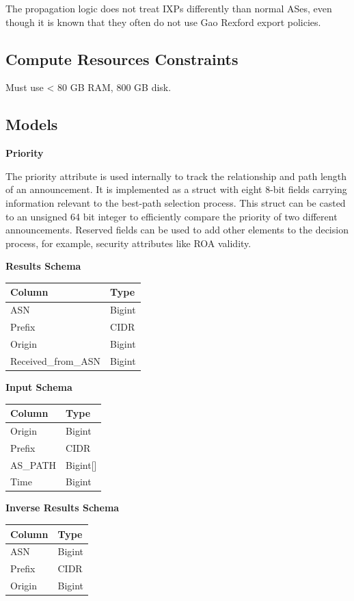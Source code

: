 \documentclass[letterpaper]{article}
\begin{document}
The propagation logic does not treat IXPs differently than normal
ASes, even though it is known that they often do not use Gao Rexford
export policies.

\hypertarget{constraints}{%
\subsection{Compute Resources Constraints}\label{constraints}}

Must use \textless{} 80 GB RAM, 800 GB disk.

\hypertarget{models}{%
\subsection{Models}\label{models}}


\textbf{Priority}

The priority attribute is used internally to track the relationship and path
length of an announcement. It is implemented as a struct with eight 8-bit fields
carrying information relevant to the best-path selection process. This struct
can be casted to an unsigned 64 bit integer to efficiently compare the priority
of two different announcements. Reserved fields can be used to add other
elements to the decision process, for example, security attributes like ROA
validity.

\textbf{Results Schema}

\begin{longtable}[]{@{}l|l@{}}
\toprule
\textbf{Column} & \textbf{Type}\tabularnewline
\endhead
\midrule
ASN & Bigint\tabularnewline
Prefix & CIDR\tabularnewline
Origin & Bigint\tabularnewline
Received\_from\_ASN & Bigint\tabularnewline
\bottomrule
\end{longtable}

\textbf{Input Schema}

\begin{longtable}[]{@{}l|l@{}}
\toprule
\textbf{Column} & \textbf{Type}\tabularnewline
\endhead
\midrule
Origin & Bigint\tabularnewline
Prefix & CIDR\tabularnewline
AS\_PATH & Bigint{[}{]}\tabularnewline
Time & Bigint\tabularnewline
\bottomrule
\end{longtable}

\textbf{Inverse Results Schema}

\begin{longtable}[]{@{}l|l@{}}
\toprule
\textbf{Column} & \textbf{Type}\tabularnewline
\endhead
\midrule
ASN & Bigint\tabularnewline
Prefix & CIDR\tabularnewline
Origin & Bigint\tabularnewline
\bottomrule
\end{longtable}
\end{document}

